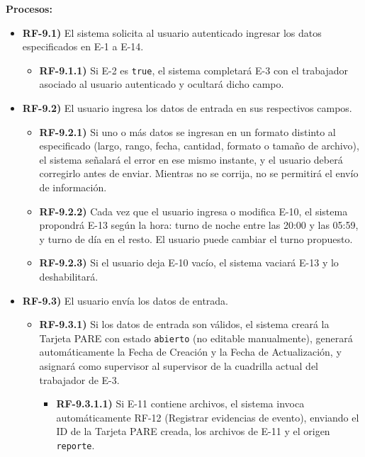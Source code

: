 \textbf{Procesos:}
\begin{itemize}[label={}, leftmargin=1.5em]
  \item \textbf{RF-9.1)} El sistema solicita al usuario autenticado ingresar los datos especificados en E-1 a E-14.
  \begin{itemize}[label={}, leftmargin=1.5em]
    \item \textbf{RF-9.1.1)} Si E-2 es \texttt{true}, el sistema completar\'a E-3 con el trabajador asociado al usuario autenticado y ocultar\'a dicho campo.
  \end{itemize}
  \item \textbf{RF-9.2)} El usuario ingresa los datos de entrada en sus respectivos campos.
  \begin{itemize}[label={}, leftmargin=1.5em]
    \item \textbf{RF-9.2.1)} Si uno o m\'as datos se ingresan en un formato distinto al especificado (largo, rango, fecha, cantidad, formato o tama\~no de archivo), el sistema se\~nalar\'a el error en ese mismo instante, y el usuario deber\'a corregirlo antes de enviar. Mientras no se corrija, no se permitir\'a el env\'io de informaci\'on.
    \item \textbf{RF-9.2.2)} Cada vez que el usuario ingresa o modifica E-10, el sistema propondr\'a E-13 seg\'un la hora: turno de noche entre las 20:00 y las 05:59, y turno de d\'ia en el resto. El usuario puede cambiar el turno propuesto.
    \item \textbf{RF-9.2.3)} Si el usuario deja E-10 vac\'io, el sistema vaciar\'a E-13 y lo deshabilitar\'a.
  \end{itemize}
  \item \textbf{RF-9.3)} El usuario env\'ia los datos de entrada.
  \begin{itemize}[label={}, leftmargin=1.5em]
    \item \textbf{RF-9.3.1)} Si los datos de entrada son v\'alidos, el sistema crear\'a la Tarjeta PARE con estado \texttt{abierto} (no editable manualmente), generar\'a autom\'aticamente la Fecha de Creaci\'on y la Fecha de Actualizaci\'on, y asignar\'a como supervisor al supervisor de la cuadrilla actual del trabajador de E-3.
    \begin{itemize}[label={}, leftmargin=1.5em]
      \item \textbf{RF-9.3.1.1)} Si E-11 contiene archivos, el sistema invoca autom\'aticamente RF-12 (Registrar evidencias de evento), enviando el ID de la Tarjeta PARE creada, los archivos de E-11 y el origen \texttt{reporte}.

\end{itemize}
\end{itemize}
\end{itemize}
